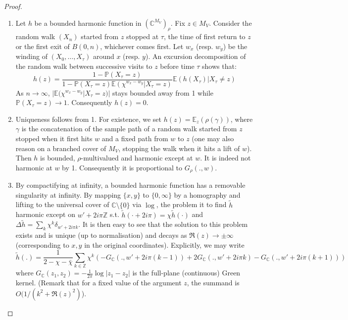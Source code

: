 \documentclass[10pt]{article}
\newcommand{\Z}{\mathbb{Z}}
\newcommand{\C}{\mathbb{C}}
\newcommand{\E}{\mathbb{E}}
\renewcommand{\P}{\mathbb{P}}
\newcommand{\Lap}{\Delta\!}
\begin{document}
\begin{proof}
\begin{enumerate}
\item Let $h$ be a bounded harmonic function in $(\C^{M_V})_\rho$. Fix $z\in M_V$. Consider the random walk $(X_n)$ started from $z$ stopped at $\tau$, the time of first return to $z$ or the first exit of $B(0,n)$, whichever comes first. Let $w_x$ (resp. $w_y$) be the winding of $(X_0,\dots,X_\tau)$ around $x$ (resp. $y$). An excursion decomposition of the random walk between successive visits to $z$ before time $\tau$ shows that:
$$h(z)=\frac{1-\P(X_\tau=z)}{1-\P(X_\tau=z)\E(\chi^{w_x-w_y}|X_\tau=z)}\E(h(X_\tau)|X_\tau\neq z)$$
As $n\rightarrow\infty$, $|\E(\chi^{w_x-w_y}|X_\tau=z)|$ stays bounded away from 1 while $\P(X_\tau=z)\rightarrow 1$. Consequently $h(z)=0$.

\item Uniqueness follows from 1. For existence, we set $h(z)=\E_z(\rho(\gamma))$, where $\gamma$ is the concatenation of the sample path of a random walk started from $z$ stopped when it first hits $w$ and a fixed path from $w$ to $z$ (one may also reason on a branched cover of $M_V$, stopping the walk when it hits a lift of $w$). Then $h$ is bounded, $\rho$-multivalued and harmonic except at $w$. It is indeed not harmonic at $w$ by 1. Consequently it is proportional to $G_\rho(.,w)$.

\item By compactifying at infinity, a bounded harmonic function has a removable singularity at infinity. By mapping $\{x,y\}$ to $\{0,\infty\}$ by a homography and lifting to the universal cover of $\C\setminus\{0\}$ via $\log$, the problem it to find $\tilde h$ harmonic except on $w'+2i\pi\Z$ s.t. $\tilde h(\cdot+2i\pi)=\chi \tilde h(\cdot)$ and $\Lap \tilde h=\sum_k\chi^k\delta_{w'+2i\pi k}$. It is then easy to see that the solution to this problem exists and is unique (up to normalisation) and decays as $\Re(z)\rightarrow \pm\infty$ (corresponding to $x,y$ in the original coordinates). Explicitly, we may write
$$\tilde h(.)=\frac{1}{2-\chi-\bar\chi}\sum_{k\in\Z}\chi^k\left(-G_\C(.,w'+2i\pi(k-1))+2G_\C(.,w'+2i\pi k)-G_\C(.,w'+2i\pi(k+1))\right)$$
where $G_\C(z_1,z_2)=-\frac{1}{2\pi}\log|z_1-z_2|$ is the full-plane (continuous) Green kernel. (Remark that for a fixed value of the argument $z$, the summand is $O(1/(k^{2}+\Re(z)^2)$).


\end{enumerate}
\end{proof}
\end{document}
